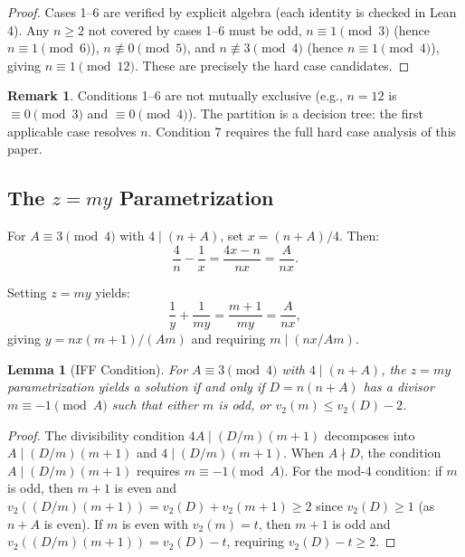 \documentclass[11pt,a4paper]{article}
\theoremstyle{plain}
\newtheorem{lemma}[theorem]{Lemma}
\theoremstyle{plain}
\theoremstyle{definition}
\newtheorem{remark}[theorem]{Remark}
\numberwithin{equation}{section}
\begin{document}
\begin{proof}
Cases 1--6 are verified by explicit algebra (each identity is checked in Lean 4). Any $n \geq 2$ not covered by cases 1--6 must be odd, $n \equiv 1 \pmod{3}$ (hence $n \equiv 1 \pmod{6}$), $n \not\equiv 0 \pmod{5}$, and $n \not\equiv 3 \pmod{4}$ (hence $n \equiv 1 \pmod{4}$), giving $n \equiv 1 \pmod{12}$. These are precisely the hard case candidates.
\end{proof}

\begin{remark}
Conditions 1--6 are not mutually exclusive (e.g., $n = 12$ is $\equiv 0 \pmod{3}$ and $\equiv 0 \pmod{4}$). The partition is a decision tree: the first applicable case resolves $n$. Condition 7 requires the full hard case analysis of this paper.
\end{remark}

\subsection{The $z = my$ Parametrization}

For $A \equiv 3 \pmod{4}$ with $4 \mid (n + A)$, set $x = (n+A)/4$. Then:
\begin{equation}
\frac{4}{n} - \frac{1}{x} = \frac{4x - n}{nx} = \frac{A}{nx}.
\end{equation}

Setting $z = my$ yields:
\begin{equation}
\frac{1}{y} + \frac{1}{my} = \frac{m+1}{my} = \frac{A}{nx},
\end{equation}
giving $y = nx(m+1)/(Am)$ and requiring $m \mid (nx/Am)$.

\begin{lemma}[IFF Condition]\label{lem:iff}
For $A \equiv 3 \pmod{4}$ with $4 \mid (n+A)$, the $z = my$ parametrization yields a solution if and only if $D = n(n+A)$ has a divisor $m \equiv -1 \pmod{A}$ such that either $m$ is odd, or $v_2(m) \leq v_2(D) - 2$.
\end{lemma}

\begin{proof}
The divisibility condition $4A \mid (D/m)(m+1)$ decomposes into $A \mid (D/m)(m+1)$ and $4 \mid (D/m)(m+1)$. When $A \nmid D$, the condition $A \mid (D/m)(m+1)$ requires $m \equiv -1 \pmod{A}$. For the mod-4 condition: if $m$ is odd, then $m + 1$ is even and $v_2((D/m)(m+1)) = v_2(D) + v_2(m+1) \geq 2$ since $v_2(D) \geq 1$ (as $n + A$ is even). If $m$ is even with $v_2(m) = t$, then $m + 1$ is odd and $v_2((D/m)(m+1)) = v_2(D) - t$, requiring $v_2(D) - t \geq 2$.
\end{proof}
\end{document}
